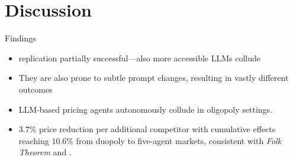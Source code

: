 \documentclass[10pt, aspectratio=169]{beamer}
\begin{document}
\section{Discussion}

\begin{frame}{Findings}
    \begin{itemize}
        \item \textcite{fish_algorithmic_2025} replication partially successful---also more accessible LLMs collude
        \item They are also prone to subtle prompt changes, resulting in vastly different outcomes
        \item LLM-based pricing agents autonomously collude in oligopoly settings.
        \item $3.7\%$ price reduction per additional competitor with cumulative effects reaching $10.6\%$ from duopoly to five-agent markets, consistent with \textit{Folk Theorem} and \textcite{calvano_artificial_2020}. 
        \end{itemize}
\end{frame}
\end{document}
